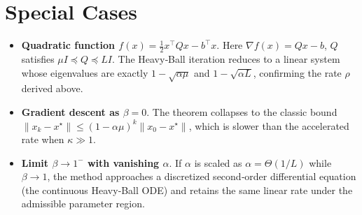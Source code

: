 \documentclass[11pt]{article}
\begin{document}
\section*{Special Cases}
\begin{itemize}[leftmargin=*]
\item \textbf{Quadratic function $f(x)=\frac{1}{2}x^{\top}Qx-b^{\top}x$}.  
Here $\nabla f(x)=Qx-b$, $Q$ satisfies $\mu I\preceq Q\preceq L I$. The Heavy‑Ball iteration reduces to a linear system whose eigenvalues are exactly $1-\sqrt{\alpha\mu}$ and $1-\sqrt{\alpha L}$, confirming the rate $\rho$ derived above.
\item \textbf{Gradient descent as $\beta=0$}.  
The theorem collapses to the classic bound $\|x_k-x^{\star}\|\le (1-\alpha\mu)^{k}\|x_0-x^{\star}\|$, which is slower than the accelerated rate when $\kappa\gg1$.
\item \textbf{Limit $\beta\to 1^{-}$ with vanishing $\alpha$}.  
If $\alpha$ is scaled as $\alpha=\Theta(1/L)$ while $\beta\to1$, the method approaches a discretized second‑order differential equation (the continuous Heavy‑Ball ODE) and retains the same linear rate under the admissible parameter region.
\end{itemize}
\end{document}
